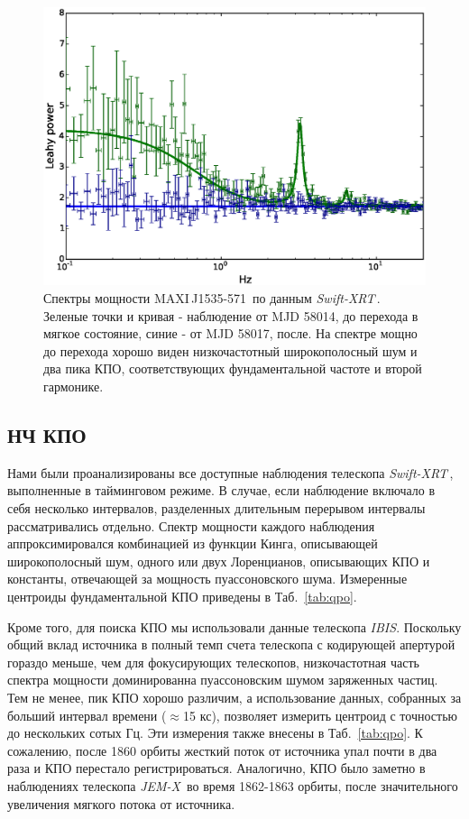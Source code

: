 \documentclass{pazhb}
\def\maxisrc{MAXI\,J1535-571}
\def\swiftx{{\em Swift-XRT\,}}
\def\jemx{{\em JEM-X}}
\def\ibis{ {\em IBIS}}
\begin{document}
\begin{figure}
\centerline{\includegraphics[width=\linewidth]{transition_v01.eps}}
\caption{Спектры мощности \maxisrc\, по данным \swiftx. Зеленые точки и кривая - наблюдение от MJD 58014, до перехода в мягкое состояние, синие - от MJD 58017, после. На спектре мощно до перехода хорошо виден низкочастотный широкополосный шум и два пика КПО, соответствующих фундаментальной частоте и второй гармонике.}
\label{fig:powtrans}
\end{figure}

\subsection{НЧ КПО}
Нами были проанализированы все доступные наблюдения телескопа \swiftx, выполненные в тайминговом режиме. В случае, если наблюдение включало в себя несколько интервалов, разделенных длительным перерывом интервалы рассматривались отдельно. Спектр мощности каждого наблюдения аппроксимировался комбинацией из функции Кинга, описывающей широкополосный шум, одного или двух Лоренцианов, описывающих КПО и константы, отвечающей за мощность пуассоновского шума. Измеренные центроиды фундаментальной КПО приведены в Таб.~\ref{tab:qpo}. 

Кроме того, для поиска КПО мы использовали данные телескопа \ibis. Поскольку общий вклад источника в полный темп счета телескопа с кодирующей апертурой гораздо меньше, чем для фокусирующих телескопов, низкочастотная часть спектра мощности доминированна пуассоновским шумом заряженных частиц. Тем не менее, пик КПО хорошо различим, а использование данных, собранных за больший интервал времени ($\approx$15 кс), позволяет измерить центроид с точностью до нескольких сотых Гц. Эти измерения также внесены в Таб.~\ref{tab:qpo}. К сожалению, после 1860 орбиты жесткий поток от источника упал почти в два раза и КПО перестало регистрироваться. Аналогично, КПО было заметно в наблюдениях телескопа \jemx\, во время 1862-1863 орбиты, после значительного увеличения мягкого потока от источника. 
\end{document}
